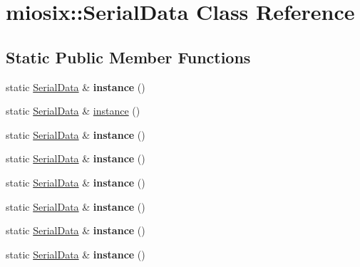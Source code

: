 \hypertarget{classmiosix_1_1_serial_data}{\section{miosix\-:\-:Serial\-Data Class Reference}
\label{classmiosix_1_1_serial_data}
}
\subsection*{Static Public Member Functions}
\begin{DoxyCompactItemize}
\item 
\hypertarget{classmiosix_1_1_serial_data_a570903171c3fcf1783d2690fe6590ffe}{static \hyperlink{classmiosix_1_1_serial_data}{Serial\-Data} \& {\bfseries instance} ()}\label{classmiosix_1_1_serial_data_a570903171c3fcf1783d2690fe6590ffe}

\item 
static \hyperlink{classmiosix_1_1_serial_data}{Serial\-Data} \& \hyperlink{classmiosix_1_1_serial_data_a570903171c3fcf1783d2690fe6590ffe}{instance} ()
\item 
\hypertarget{classmiosix_1_1_serial_data_a570903171c3fcf1783d2690fe6590ffe}{static \hyperlink{classmiosix_1_1_serial_data}{Serial\-Data} \& {\bfseries instance} ()}\label{classmiosix_1_1_serial_data_a570903171c3fcf1783d2690fe6590ffe}

\item 
\hypertarget{classmiosix_1_1_serial_data_a570903171c3fcf1783d2690fe6590ffe}{static \hyperlink{classmiosix_1_1_serial_data}{Serial\-Data} \& {\bfseries instance} ()}\label{classmiosix_1_1_serial_data_a570903171c3fcf1783d2690fe6590ffe}

\item 
\hypertarget{classmiosix_1_1_serial_data_a570903171c3fcf1783d2690fe6590ffe}{static \hyperlink{classmiosix_1_1_serial_data}{Serial\-Data} \& {\bfseries instance} ()}\label{classmiosix_1_1_serial_data_a570903171c3fcf1783d2690fe6590ffe}

\item 
\hypertarget{classmiosix_1_1_serial_data_a570903171c3fcf1783d2690fe6590ffe}{static \hyperlink{classmiosix_1_1_serial_data}{Serial\-Data} \& {\bfseries instance} ()}\label{classmiosix_1_1_serial_data_a570903171c3fcf1783d2690fe6590ffe}

\item 
\hypertarget{classmiosix_1_1_serial_data_a570903171c3fcf1783d2690fe6590ffe}{static \hyperlink{classmiosix_1_1_serial_data}{Serial\-Data} \& {\bfseries instance} ()}\label{classmiosix_1_1_serial_data_a570903171c3fcf1783d2690fe6590ffe}

\item 
\hypertarget{classmiosix_1_1_serial_data_a570903171c3fcf1783d2690fe6590ffe}{static \hyperlink{classmiosix_1_1_serial_data}{Serial\-Data} \& {\bfseries instance} ()}\label{classmiosix_1_1_serial_data_a570903171c3fcf1783d2690fe6590ffe}

\end{DoxyCompactItemize}
